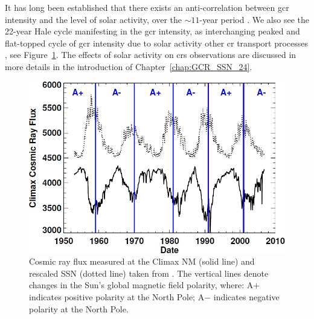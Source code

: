 It has long been established that there exists an anti-correlation between \gls{gcr} intensity and the level of solar activity, over the $\sim11$-year period \citep{forbush_cosmic-ray_1958, parker_passage_1965, usoskin_correlative_1998, van_allen_modulation_2000}. We also see the 22-year Hale cycle manifesting in the \gls{gcr} intensity, as interchanging peaked and flat-topped cycle of \gls{gcr} intensity due to solar activity other \gls{cr} transport processes \citep{aslam_solar_2012, thomas_22-year_2014}, see Figure~\ref{fig:gcr_plot}. The effects of solar activity on \glspl{cr} observations are discussed in more details in the introduction of Chapter~\ref{chap:GCR_SSN_24}.

\begin{figure}[ht!]
	\centering
	\includegraphics[width=\columnwidth]{gcr.png}
	\caption{Cosmic ray flux measured at the Climax NM (solid line) and rescaled SSN (dotted line) taken from \citet{hathaway_solar_2015}. The vertical lines denote changes in the Sun's global magnetic field polarity, where: A$+$ indicates positive polarity at the North Pole; A$-$ indicates negative polarity at the North Pole.}
	\label{fig:gcr_plot}
\end{figure}

